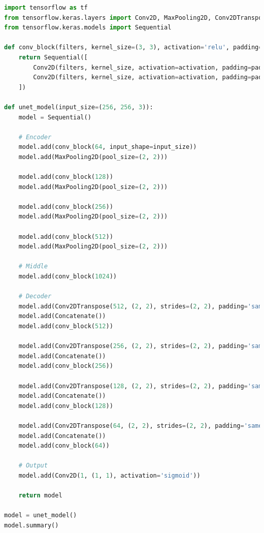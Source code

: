 \begin{lstlisting}[language=Python]
import tensorflow as tf
from tensorflow.keras.layers import Conv2D, MaxPooling2D, Conv2DTranspose, Concatenate
from tensorflow.keras.models import Sequential

def conv_block(filters, kernel_size=(3, 3), activation='relu', padding='same'):
    return Sequential([
        Conv2D(filters, kernel_size, activation=activation, padding=padding),
        Conv2D(filters, kernel_size, activation=activation, padding=padding)
    ])

def unet_model(input_size=(256, 256, 3)):
    model = Sequential()
    
    # Encoder
    model.add(conv_block(64, input_shape=input_size))
    model.add(MaxPooling2D(pool_size=(2, 2)))
    
    model.add(conv_block(128))
    model.add(MaxPooling2D(pool_size=(2, 2)))
    
    model.add(conv_block(256))
    model.add(MaxPooling2D(pool_size=(2, 2)))
    
    model.add(conv_block(512))
    model.add(MaxPooling2D(pool_size=(2, 2)))
    
    # Middle
    model.add(conv_block(1024))
    
    # Decoder
    model.add(Conv2DTranspose(512, (2, 2), strides=(2, 2), padding='same'))
    model.add(Concatenate())
    model.add(conv_block(512))
    
    model.add(Conv2DTranspose(256, (2, 2), strides=(2, 2), padding='same'))
    model.add(Concatenate())
    model.add(conv_block(256))
    
    model.add(Conv2DTranspose(128, (2, 2), strides=(2, 2), padding='same'))
    model.add(Concatenate())
    model.add(conv_block(128))
    
    model.add(Conv2DTranspose(64, (2, 2), strides=(2, 2), padding='same'))
    model.add(Concatenate())
    model.add(conv_block(64))
    
    # Output
    model.add(Conv2D(1, (1, 1), activation='sigmoid'))
    
    return model

model = unet_model()
model.summary()
\end{lstlisting}

